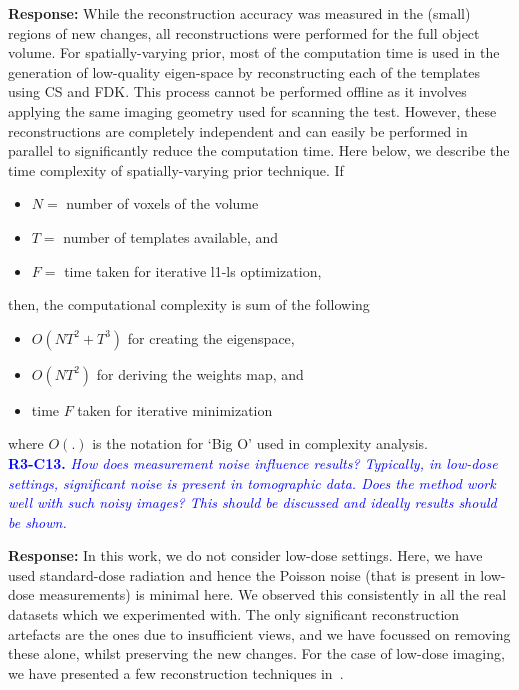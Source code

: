 \documentclass{article}
\begin{document}
\textbf{Response:} While the reconstruction accuracy was measured in
the (small) regions of new changes, all reconstructions were performed
for the full object volume. For spatially-varying prior, most of the
computation time is used in the generation of low-quality eigen-space
by reconstructing each of the templates using CS and FDK. This process
cannot be performed offline as it involves applying the same imaging
geometry used for scanning the test. However, these reconstructions
are completely independent and can easily be performed in parallel to
significantly reduce the computation time. Here below, we describe the
time complexity of spatially-varying prior technique.  If
\begin{itemize}
\item $N =$ number of voxels of the volume
\item $T =$ number of templates available, and
\item $F =$ time taken for iterative l1-ls optimization,
\end{itemize}
then, the computational complexity is sum of the following
\begin{itemize}
\item $O(NT^2+T^3)$ for creating the eigenspace,
\item $O(NT^2)$ for deriving the weights map, and
\item time $F$  taken for iterative minimization
\end{itemize}
where $O(.)$ is the notation for `Big O' used in complexity analysis.\\


\textcolor{blue}{\textbf{R3-C13.}\textit{ How does measurement noise influence results? Typically, in low-dose settings, significant noise is present in tomographic data. Does the method work well with such noisy images? This should be discussed and ideally results should be shown.}}

\textbf{Response:} In this work, we do not consider low-dose settings. Here, we have used standard-dose radiation and hence the Poisson noise (that is present in low-dose measurements) is minimal here. We observed this consistently in all the real datasets which we experimented with. The only significant reconstruction artefacts are the ones due to insufficient views, and we have focussed on removing these alone, whilst preserving the new changes.
For the case of low-dose imaging, we have presented a few reconstruction techniques in~\cite{gopal2019low}.\\
\end{document}
